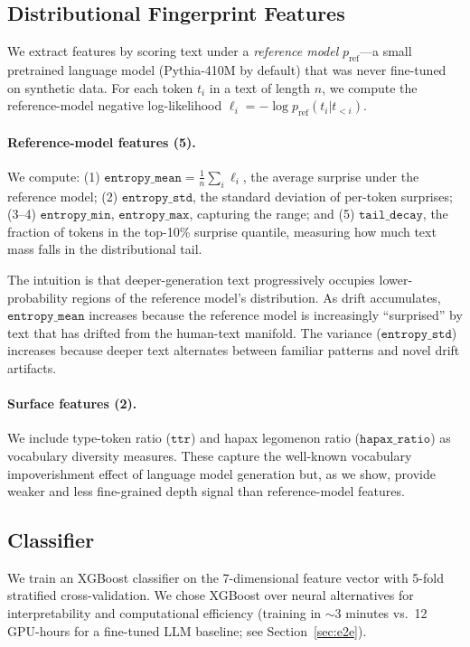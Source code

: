\documentclass[letterpaper, 10pt]{article}
\begin{document}
\subsection{Distributional Fingerprint Features}

We extract features by scoring text under a \emph{reference model} $p_{\text{ref}}$---a small pretrained language model (Pythia-410M by default) that was never fine-tuned on synthetic data.
For each token $t_i$ in a text of length $n$, we compute the reference-model negative log-likelihood $\ell_i = -\log p_{\text{ref}}(t_i | t_{<i})$.

\paragraph{Reference-model features (5).}
We compute: (1) $\texttt{entropy\_mean} = \frac{1}{n}\sum_i \ell_i$, the average surprise under the reference model; (2) $\texttt{entropy\_std}$, the standard deviation of per-token surprises; (3--4) $\texttt{entropy\_min}$, $\texttt{entropy\_max}$, capturing the range; and (5) $\texttt{tail\_decay}$, the fraction of tokens in the top-10\% surprise quantile, measuring how much text mass falls in the distributional tail.

The intuition is that deeper-generation text progressively occupies lower-probability regions of the reference model's distribution.
As drift accumulates, $\texttt{entropy\_mean}$ increases because the reference model is increasingly ``surprised'' by text that has drifted from the human-text manifold.
The variance ($\texttt{entropy\_std}$) increases because deeper text alternates between familiar patterns and novel drift artifacts.

\paragraph{Surface features (2).}
We include type-token ratio ($\texttt{ttr}$) and hapax legomenon ratio ($\texttt{hapax\_ratio}$) as vocabulary diversity measures.
These capture the well-known vocabulary impoverishment effect of language model generation but, as we show, provide weaker and less fine-grained depth signal than reference-model features.

\subsection{Classifier}

We train an XGBoost classifier on the 7-dimensional feature vector with 5-fold stratified cross-validation.
We chose XGBoost over neural alternatives for interpretability and computational efficiency (training in $\sim$3 minutes vs.\ 12 GPU-hours for a fine-tuned LLM baseline; see Section~\ref{sec:e2e}).
\end{document}
